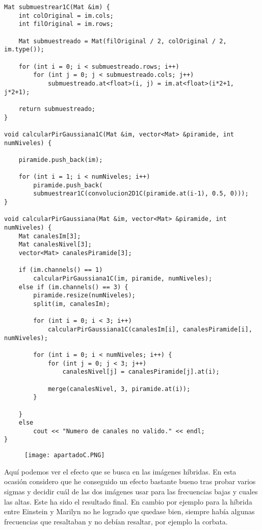 \documentclass[10pt,a4paper]{article}
\begin{document}
\begin{lstlisting}
Mat submuestrear1C(Mat &im) {
	int colOriginal = im.cols;
	int filOriginal = im.rows;

	Mat submuestreado = Mat(filOriginal / 2, colOriginal / 2, im.type());

	for (int i = 0; i < submuestreado.rows; i++)
		for (int j = 0; j < submuestreado.cols; j++)
			submuestreado.at<float>(i, j) = im.at<float>(i*2+1, j*2+1);

	return submuestreado;
}

void calcularPirGaussiana1C(Mat &im, vector<Mat> &piramide, int numNiveles) {

	piramide.push_back(im);

	for (int i = 1; i < numNiveles; i++)
		piramide.push_back(
		submuestrear1C(convolucion2D1C(piramide.at(i-1), 0.5, 0)));
}

void calcularPirGaussiana(Mat &im, vector<Mat> &piramide, int numNiveles) {
	Mat canalesIm[3];
	Mat canalesNivel[3];
	vector<Mat> canalesPiramide[3];

	if (im.channels() == 1) 
		calcularPirGaussiana1C(im, piramide, numNiveles);	
	else if (im.channels() == 3) {
		piramide.resize(numNiveles);
		split(im, canalesIm);

		for (int i = 0; i < 3; i++)
			calcularPirGaussiana1C(canalesIm[i], canalesPiramide[i], numNiveles);		

		for (int i = 0; i < numNiveles; i++) {
			for (int j = 0; j < 3; j++)
				canalesNivel[j] = canalesPiramide[j].at(i);

			merge(canalesNivel, 3, piramide.at(i));
		}

	}
	else
		cout << "Numero de canales no valido." << endl;
}
\end{lstlisting}

\begin{figure}[H]
\centering
\texttt{[image: apartadoC.PNG]}
\end{figure}

Aquí podemos ver el efecto que se busca en las imágenes híbridas. En esta ocasión considero que he conseguido un efecto bastante bueno tras probar varios sigmas y decidir cuál de las dos imágenes usar para las frecuencias bajas y cuales las altas. Este ha sido el resultado final. En cambio por ejemplo para la híbrida entre Einstein y Marilyn no he logrado que quedase bien, siempre había algunas frecuencias que resaltaban y no debían resaltar, por ejemplo la corbata.\\
\end{document}
